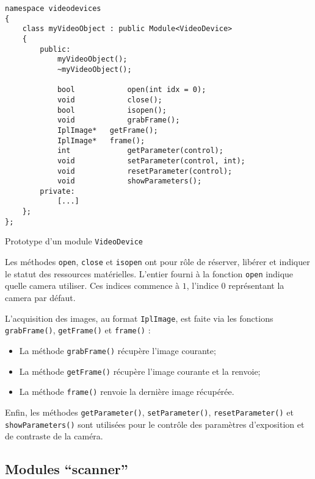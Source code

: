 \documentclass[10pt,a4paper,twoside, twocolumn]{report}
\begin{document}
\begin{code}[ht!]\centering
	\begin{lstlisting}
namespace videodevices
{
	class myVideoObject : public Module<VideoDevice>
	{		
		public:
			myVideoObject();
			~myVideoObject();

			bool			open(int idx = 0);
			void			close();
			bool			isopen();
			void			grabFrame();
			IplImage*	getFrame();
			IplImage*	frame();
			int 			getParameter(control);
			void			setParameter(control, int);
			void			resetParameter(control);
			void			showParameters();
		private:
			[...]
	};
};
	\end{lstlisting}
	\caption{Prototype d’un module \texttt{VideoDevice}}
\end{code}

Les méthodes \texttt{open}, \texttt{close} et \texttt{isopen} ont pour rôle de réserver, libérer et indiquer le statut des ressources matérielles. L’entier fourni à la fonction \texttt{open} indique quelle camera utiliser. Ces indices commence à $1$, l’indice $0$ représentant la camera par défaut.

L’acquisition des images, au format \texttt{IplImage}, est faite via les fonctions \texttt{grabFrame()}, \texttt{getFrame()} et \texttt{frame()} :
\begin{itemize}
	\item La méthode \texttt{grabFrame()} récupère l’image courante;
	\item La méthode \texttt{getFrame()} récupère l’image courante et la renvoie;
	\item La méthode \texttt{frame()} renvoie la dernière image récupérée.
\end{itemize}

Enfin, les méthodes \texttt{getParameter()}, \texttt{setParameter()}, \texttt{resetParameter()} et \texttt{showParameters()} sont utilisées pour le contrôle des paramètres d'exposition et de contraste de la caméra.



\subsection{Modules “scanner”}\label{section:module:scanner}
\end{document}

